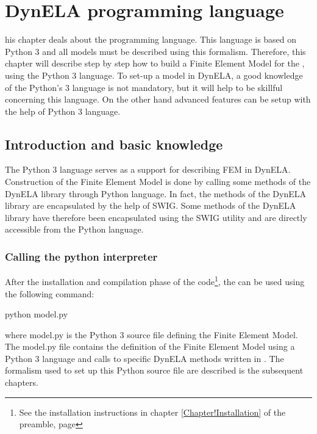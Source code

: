 %
%
%
\chapter{DynELA programming language}

\startcontents[chapters]
\printmyminitoc[1]his chapter deals about the \DynELA programming language. This language is based on Python 3 and all models must be described using this formalism. Therefore, this chapter will describe step by step how to build a Finite Element Model for the \DynELA, using the Python 3 language. To set-up a model in DynELA, a good knowledge of the Python's 3 language is not mandatory, but it will help to be skillful concerning this language. On the other hand advanced features can be setup with the help of Python 3 language.

\section{Introduction and basic knowledge}
The Python 3 language serves as a support for describing FEM in DynELA. Construction of the Finite Element Model is done by calling some \Cpp methods of the DynELA library through Python language. In fact, the \Cpp methods of the DynELA library are encapsulated by the help of SWIG. Some methods of the DynELA library have therefore been encapsulated using the SWIG utility and are directly accessible from the Python language.

\subsection{Calling the python interpreter}

After the installation and compilation phase of the code\footnote{See the installation instructions in chapter \ref{Chapter!Installation} of the preamble, page \pageref{Chapter!Installation}}, the \DynELA can be used using the following command:

\begin{BashListing}
python model.py
\end{BashListing}

where \textsf{model.py} is the Python 3 source file defining the Finite Element Model. The \textsf{model.py} file contains the definition of the Finite Element Model using a Python 3 language and calls to specific DynELA methods written in \Cpp. The formalism used to set up this Python source file are described is the subsequent chapters.


